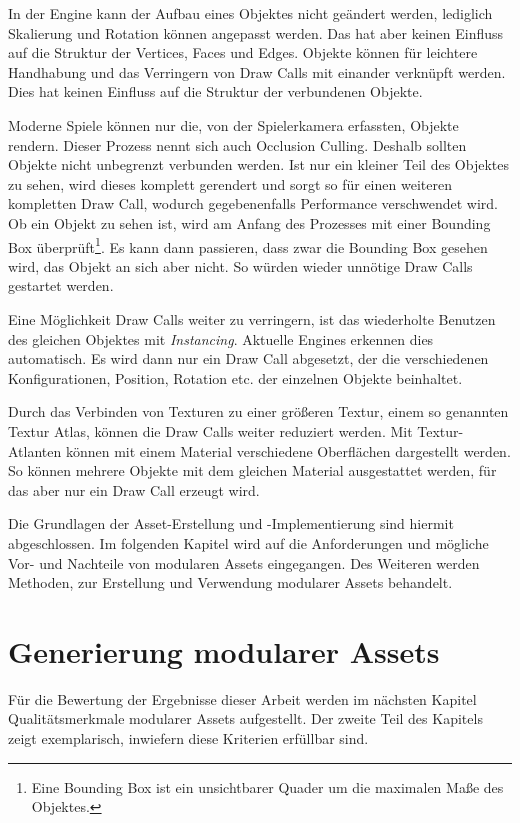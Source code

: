 \par
In der Engine kann der Aufbau eines Objektes nicht geändert werden, lediglich Skalierung und Rotation können angepasst werden. Das hat aber keinen Einfluss auf die Struktur der Vertices, Faces und Edges. Objekte können für leichtere Handhabung und das Verringern von Draw Calls mit einander verknüpft werden. Dies hat keinen Einfluss auf die Struktur der verbundenen Objekte.
\par
Moderne Spiele können nur die, von der Spielerkamera erfassten, Objekte rendern. Dieser Prozess nennt sich auch Occlusion Culling. Deshalb sollten Objekte nicht unbegrenzt verbunden werden.  Ist nur ein kleiner Teil des Objektes zu sehen, wird dieses komplett gerendert und sorgt so für einen weiteren kompletten Draw Call, wodurch gegebenenfalls Performance verschwendet wird. Ob ein Objekt zu sehen ist, wird am Anfang des Prozesses mit einer Bounding Box überprüft\footnote{Eine Bounding Box ist ein unsichtbarer Quader um die maximalen Maße des Objektes.}. Es kann dann passieren, dass zwar die Bounding Box gesehen wird, das Objekt an sich aber nicht. So würden wieder unnötige Draw Calls gestartet werden. \parencite{gpu}
\par
Eine Möglichkeit Draw Calls weiter zu verringern, ist das wiederholte Benutzen des gleichen Objektes mit \textit{Instancing}. Aktuelle Engines erkennen dies automatisch. Es wird dann nur ein Draw Call abgesetzt, der die verschiedenen Konfigurationen, Position, Rotation etc. der einzelnen Objekte beinhaltet. \parencite{gpu}
\par
Durch das Verbinden von Texturen zu einer größeren Textur, einem so genannten Textur Atlas, können die Draw Calls weiter reduziert werden. Mit Textur-Atlanten können mit einem Material verschiedene Oberflächen dargestellt werden. So können mehrere Objekte mit dem gleichen Material ausgestattet werden, für das aber nur ein Draw Call erzeugt wird. \parencite{gpu} 
\par
Die Grundlagen der Asset-Erstellung und -Implementierung sind hiermit abgeschlossen. Im folgenden Kapitel wird auf die Anforderungen und mögliche Vor- und Nachteile von modularen Assets eingegangen. Des Weiteren werden Methoden, zur Erstellung und Verwendung modularer Assets behandelt.
\chapter{Generierung modularer Assets}
Für die Bewertung der Ergebnisse dieser Arbeit werden im nächsten Kapitel Qualitätsmerkmale modularer Assets aufgestellt. Der zweite Teil des Kapitels zeigt exemplarisch, inwiefern diese Kriterien erfüllbar sind.
